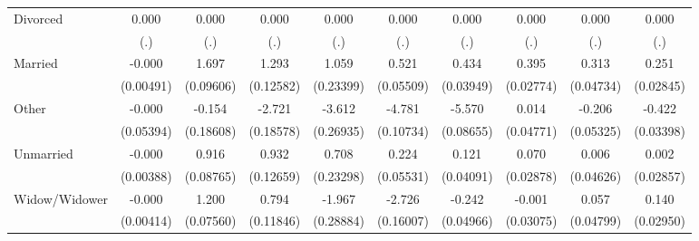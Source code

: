 {\begin{tabular}{l*{9}{c}}
Divorced            &       0.000         &       0.000         &       0.000         &       0.000         &       0.000         &       0.000         &       0.000         &       0.000         &       0.000         \\
                    &         (.)         &         (.)         &         (.)         &         (.)         &         (.)         &         (.)         &         (.)         &         (.)         &         (.)         \\
Married             &      -0.000         &       1.697\sym{***}&       1.293\sym{***}&       1.059\sym{***}&       0.521\sym{***}&       0.434\sym{***}&       0.395\sym{***}&       0.313\sym{***}&       0.251\sym{***}\\
                    &   (0.00491)         &   (0.09606)         &   (0.12582)         &   (0.23399)         &   (0.05509)         &   (0.03949)         &   (0.02774)         &   (0.04734)         &   (0.02845)         \\
Other               &      -0.000         &      -0.154         &      -2.721\sym{***}&      -3.612\sym{***}&      -4.781\sym{***}&      -5.570\sym{***}&       0.014         &      -0.206\sym{***}&      -0.422\sym{***}\\
                    &   (0.05394)         &   (0.18608)         &   (0.18578)         &   (0.26935)         &   (0.10734)         &   (0.08655)         &   (0.04771)         &   (0.05325)         &   (0.03398)         \\
Unmarried           &      -0.000         &       0.916\sym{***}&       0.932\sym{***}&       0.708\sym{**} &       0.224\sym{***}&       0.121\sym{**} &       0.070\sym{*}  &       0.006         &       0.002         \\
                    &   (0.00388)         &   (0.08765)         &   (0.12659)         &   (0.23298)         &   (0.05531)         &   (0.04091)         &   (0.02878)         &   (0.04626)         &   (0.02857)         \\
Widow/Widower       &      -0.000         &       1.200\sym{***}&       0.794\sym{***}&      -1.967\sym{***}&      -2.726\sym{***}&      -0.242\sym{***}&      -0.001         &       0.057         &       0.140\sym{***}\\
                    &   (0.00414)         &   (0.07560)         &   (0.11846)         &   (0.28884)         &   (0.16007)         &   (0.04966)         &   (0.03075)         &   (0.04799)         &   (0.02950)         \\

\end{tabular}}

